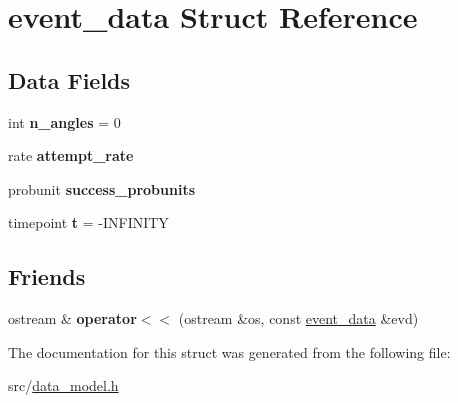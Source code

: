 \hypertarget{structevent__data}{}\section{event\+\_\+data Struct Reference}
\label{structevent__data}
\subsection*{Data Fields}
\begin{DoxyCompactItemize}
\item 
int {\bfseries n\+\_\+angles} = 0\hypertarget{structevent__data_a4ac8163657589d149ed034f321b61ce9}{}\label{structevent__data_a4ac8163657589d149ed034f321b61ce9}

\item 
rate {\bfseries attempt\+\_\+rate}\hypertarget{structevent__data_aa12da1e46a4e8e401433e90fd97fc015}{}\label{structevent__data_aa12da1e46a4e8e401433e90fd97fc015}

\item 
probunit {\bfseries success\+\_\+probunits}\hypertarget{structevent__data_a74dff9b3b11ccf5cc10e96a54c582f0f}{}\label{structevent__data_a74dff9b3b11ccf5cc10e96a54c582f0f}

\item 
timepoint {\bfseries t} = -\/I\+N\+F\+I\+N\+I\+TY\hypertarget{structevent__data_aa2f4362fb8d987420d6941e29cb50710}{}\label{structevent__data_aa2f4362fb8d987420d6941e29cb50710}

\end{DoxyCompactItemize}
\subsection*{Friends}
\begin{DoxyCompactItemize}
\item 
ostream \& {\bfseries operator$<$$<$} (ostream \&os, const \hyperlink{structevent__data}{event\+\_\+data} \&evd)\hypertarget{structevent__data_a39ddcc1bb1a2d01e9868f33afdb1beba}{}\label{structevent__data_a39ddcc1bb1a2d01e9868f33afdb1beba}

\end{DoxyCompactItemize}


The documentation for this struct was generated from the following file\+:\begin{DoxyCompactItemize}
\item 
src/\hyperlink{data__model_8h}{data\+\_\+model.\+h}\end{DoxyCompactItemize}
